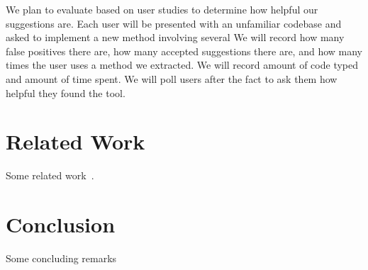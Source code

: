 \documentclass[preprint,10pt]{sigplanconf}
\begin{document}
We plan to evaluate based on user studies to determine how helpful our suggestions are.  Each user will be presented with an unfamiliar codebase and asked to implement a new method involving several   We will record how many false positives there are, how many accepted suggestions there are, and how many times the user uses a method we extracted. We will record amount of code typed and amount of time spent. We will poll users after the fact to ask them how helpful they found the tool.

\section{Related Work}

Some related work~\cite{Roy2009}.

\section{Conclusion}

Some concluding remarks

%

%
%
\end{document}
